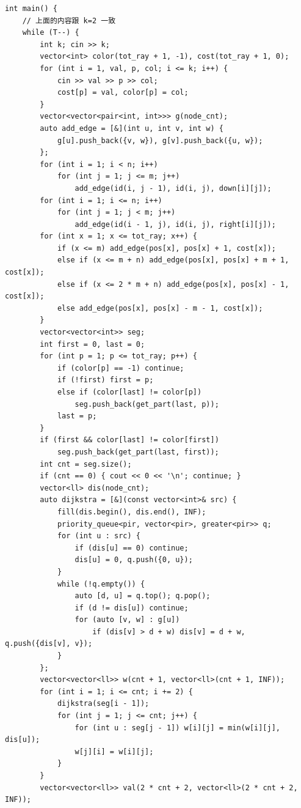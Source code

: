 \documentclass{book}
\begin{document}
\begin{lstlisting}[style = code]
int main() {
    // 上面的内容跟 k=2 一致
    while (T--) {
        int k; cin >> k;
        vector<int> color(tot_ray + 1, -1), cost(tot_ray + 1, 0);
        for (int i = 1, val, p, col; i <= k; i++) {
            cin >> val >> p >> col;
            cost[p] = val, color[p] = col;
        }
        vector<vector<pair<int, int>>> g(node_cnt);
        auto add_edge = [&](int u, int v, int w) {
            g[u].push_back({v, w}), g[v].push_back({u, w});
        };
        for (int i = 1; i < n; i++)
            for (int j = 1; j <= m; j++)
                add_edge(id(i, j - 1), id(i, j), down[i][j]);
        for (int i = 1; i <= n; i++)
            for (int j = 1; j < m; j++)
                add_edge(id(i - 1, j), id(i, j), right[i][j]);
        for (int x = 1; x <= tot_ray; x++) {
            if (x <= m) add_edge(pos[x], pos[x] + 1, cost[x]);
            else if (x <= m + n) add_edge(pos[x], pos[x] + m + 1, cost[x]);
            else if (x <= 2 * m + n) add_edge(pos[x], pos[x] - 1, cost[x]);
            else add_edge(pos[x], pos[x] - m - 1, cost[x]);
        }
        vector<vector<int>> seg;
        int first = 0, last = 0;
        for (int p = 1; p <= tot_ray; p++) {
            if (color[p] == -1) continue;
            if (!first) first = p;
            else if (color[last] != color[p]) 
                seg.push_back(get_part(last, p));
            last = p;
        }
        if (first && color[last] != color[first])
            seg.push_back(get_part(last, first));
        int cnt = seg.size();
        if (cnt == 0) { cout << 0 << '\n'; continue; }
        vector<ll> dis(node_cnt);
        auto dijkstra = [&](const vector<int>& src) {
            fill(dis.begin(), dis.end(), INF);
            priority_queue<pir, vector<pir>, greater<pir>> q;
            for (int u : src) {
                if (dis[u] == 0) continue;
                dis[u] = 0, q.push({0, u});
            }
            while (!q.empty()) {
                auto [d, u] = q.top(); q.pop();
                if (d != dis[u]) continue;
                for (auto [v, w] : g[u]) 
                    if (dis[v] > d + w) dis[v] = d + w, q.push({dis[v], v});
            }
        };
        vector<vector<ll>> w(cnt + 1, vector<ll>(cnt + 1, INF));
        for (int i = 1; i <= cnt; i += 2) {
            dijkstra(seg[i - 1]);
            for (int j = 1; j <= cnt; j++) {
                for (int u : seg[j - 1]) w[i][j] = min(w[i][j], dis[u]);
                w[j][i] = w[i][j];
            }
        }
        vector<vector<ll>> val(2 * cnt + 2, vector<ll>(2 * cnt + 2, INF));

\end{lstlisting}
\end{document}
